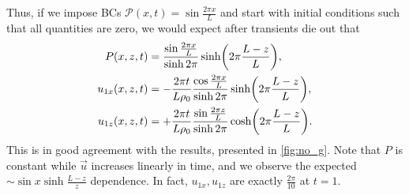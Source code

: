 \documentclass[11pt,
        usenames, %
        dvipsnames %
    ]{report}
\DeclarePairedDelimiter\p{\lparen}{\rparen}
\begin{document}
Thus, if we impose BCs $\mathcal{P}(x, t) = \sin \frac{2\pi x}{L}$ and start
with initial conditions such that all quantities are zero, we would expect after
transients die out that
\begin{equation}
    \begin{split}
        P(x, z, t) &= \frac{\sin \frac{2\pi x}{L}}{\sinh 2\pi}
            \sinh \p*{2\pi \frac{L - z}{L}},\\
        u_{1x}(x, z, t) &= -\frac{2\pi t}{L\rho_0}
            \frac{\cos \frac{2\pi x}{L}}{\sinh 2\pi}\sinh \p*{2\pi \frac{L -
                z}{L}},\\
        u_{1z}(x, z, t) &= +\frac{2\pi t}{L\rho_0}
            \frac{\sin \frac{2\pi z}{L}}{\sinh 2\pi}\cosh \p*{2\pi \frac{L -
                z}{L}}.
    \end{split}\label{eq:incomp_nog_sol}
\end{equation}
This is in good agreement with the results, presented in \autoref{fig:no_g}.
Note that $P$ is constant while $\vec{u}$ increases linearly in time, and we
observe the expected $\sim \sin x \sinh \frac{L - z}{z}$ dependence. In fact,
$u_{1x}, u_{1z}$ are exactly $\frac{2\pi}{10}$ at $t = 1$.
\end{document}
